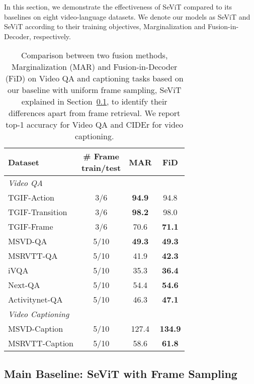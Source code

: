 \documentclass{article}
\newcommand{\frameworkname}{SeViT}
\begin{document}
In this section, we demonstrate the effectiveness of \frameworkname{} compared to its baselines on eight video-language datasets. We denote our models as \frameworkname{} and \frameworkname{} according to their training objectives, Marginalization and Fusion-in-Decoder, respectively. 

\begin{table}[t!]
    \centering
    \small
    \caption{Comparison between two fusion methods, Marginalization (MAR) and Fusion-in-Decoder (FiD) on Video QA and captioning tasks based on our baseline with uniform frame sampling, \frameworkname{} explained in Section~\ref{subsec:baseline}, to identify their differences apart from frame retrieval. We report top-1 accuracy for Video QA and CIDEr for video captioning.}
    \vskip 0.15in
\begin{tabular}{lccc}
        \toprule
        Dataset & \makecell{\# Frame \\ train/test} & MAR & FiD \\
        \midrule
        \textit{Video QA} & & & \\
        TGIF-Action & 3/6 & \textbf{94.9} & 94.8 \\
        TGIF-Transition & 3/6 & \textbf{98.2} & 98.0 \\
        TGIF-Frame & 3/6 & 70.6 & \textbf{71.1} \\
        MSVD-QA & 5/10 & \textbf{49.3} & \textbf{49.3} \\
        MSRVTT-QA & 5/10 & 41.9 & \textbf{42.3} \\
        iVQA & 5/10 & 35.3 & \textbf{36.4} \\
        Next-QA & 5/10 & 54.4 & \textbf{54.6} \\
        Activitynet-QA & 5/10 & 46.3 & \textbf{47.1} \\
        \midrule
        \textit{Video Captioning} & & & \\
        MSVD-Caption & 5/10 & 127.4 & \textbf{134.9} \\
        MSRVTT-Caption & 5/10 & 58.6 & \textbf{61.8} \\
        \bottomrule
    \end{tabular}
\label{table:comparing_fusion_method}
    \vspace{-2mm}
\end{table} 
\subsection{Main Baseline: \frameworkname{} with Frame Sampling}
\label{subsec:baseline}
\end{document}
